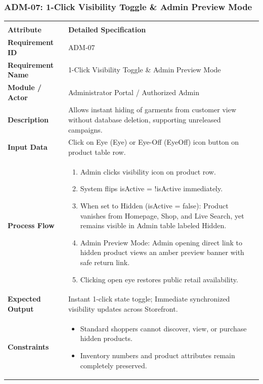 \documentclass[12pt,a4paper,oneside]{report}
\begin{document}
\subsubsection{ADM-07: 1-Click Visibility Toggle \& Admin Preview Mode}
\begin{longtable}{|p{3.6cm}|p{11.9cm}|}
\hline
\rowcolor{PrimaryBrown}
\multicolumn{2}{|p{15.5cm}|}{\textbf{\textcolor{white}{Functional Specification: ADM-07 -- 1-Click Visibility Toggle \& Admin Preview Mode}}} \\
\hline
\endfirsthead
\hline
\rowcolor{PrimaryBrown}
\multicolumn{2}{|p{15.5cm}|}{\textbf{\textcolor{white}{Functional Specification: ADM-07 (Continued)}}} \\
\hline
\textbf{Attribute} & \textbf{Detailed Specification} \\
\hline
\endhead
\hline
\endfoot
\textbf{Requirement ID} & ADM-07 \\
\hline
\textbf{Requirement Name} & 1-Click Visibility Toggle \& Admin Preview Mode \\
\hline
\textbf{Module / Actor} & Administrator Portal / Authorized Admin \\
\hline
\textbf{Description} & Allows instant hiding of garments from customer view without database deletion, supporting unreleased campaigns. \\
\hline
\textbf{Input Data} & Click on Eye (Eye) or Eye-Off (EyeOff) icon button on product table row. \\
\hline
\textbf{Process Flow} & \begin{enumerate}[leftmargin=*,nosep,topsep=2pt]
  \item Admin clicks visibility icon on product row.
  \item System flips isActive = !isActive immediately.
  \item When set to Hidden (isActive = false): Product vanishes from Homepage, Shop, and Live Search, yet remains visible in Admin table labeled Hidden.
  \item Admin Preview Mode: Admin opening direct link to hidden product views an amber preview banner with safe return link.
  \item Clicking open eye restores public retail availability.
\end{enumerate} \\
\hline
\textbf{Expected Output} & Instant 1-click state toggle; Immediate synchronized visibility updates across Storefront. \\
\hline
\textbf{Constraints} & \begin{itemize}[leftmargin=*,nosep,topsep=2pt]
  \item Standard shoppers cannot discover, view, or purchase hidden products.
  \item Inventory numbers and product attributes remain completely preserved.
\end{itemize} \\
\hline
\end{longtable}
\end{document}
